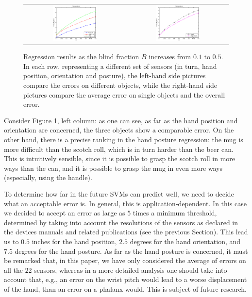 \begin{figure}[htbp]
\begin{center}
\begin{tabular}{cc}
      \includegraphics[width=0.45\textwidth]{error_pst.eps} &
      \includegraphics[width=0.45\textwidth]{error_cmp_pst.eps} \\
    \end{tabular}
    \caption{Regression results as the blind fraction $B$ increases
    from $0.1$ to $0.5$. In each row, representing a different set of
    sensors (in turn, hand position, orientation and posture), the
    left-hand side pictures compare the errors on different objects,
    while the right-hand side pictures compare the average error on
    single objects and the overall error.}
    \label{fig:err_all}
  \end{center}
\end{figure}

Consider Figure \ref{fig:err_all}, left column: as one can see, as far
as the hand position and orientation are concerned, the three objects
show a comparable error. On the other hand, there is a precise ranking
in the hand posture regression: the mug is more difficult than the
scotch roll, which is in turn harder than the beer can. This is
intuitively sensible, since it is possible to grasp the scotch roll in
more ways than the can, and it is possible to grasp the mug in even
more ways (especially, using the handle).

To determine how far in the future SVMs can predict well, we need to
decide what an acceptable error is. In general, this is
application-dependent. In this case we decided to accept an error as
large as $5$ times a minimum threshold, determined by taking into
account the resolutions of the sensors as declared in the devices
manuals and related publications (see the previous Section). This lead
us to $0.5$ inches for the hand position, $2.5$ degrees for the hand
orientation, and $7.5$ degrees for the hand posture. As far as the
hand posture is concerned, it must be remarked that, in this paper, we
have only considered the average of errors on all the $22$ sensors,
whereas in a more detailed analysis one should take into account that,
e.g., an error on the wrist pitch would lead to a worse displacement
of the hand, than an error on a phalanx would. This is subject of
future research.

